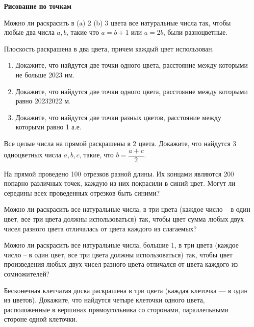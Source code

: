 \documentclass{article}
\begin{document}
    \large

    \begin{center}
        \textbf{Рисование по точкам}
    \end{center}


    \begin{enumerate_boxed}

        \item Можно ли раскрасить в (a) 2 (b) 3 цвета все натуральные числа так, чтобы любые два числа $a, b$, такие что $a = b + 1$ или $a = 2b$, были разноцветные.

        \item Плоскость раскрашена в два цвета, причем каждый цвет использован.
        \begin{enumerate}
            \item Докажите, что найдутся две точки одного цвета, расстояние между которыми не больше 2023 нм.

            \item Докажите, что найдутся две точки одного цвета, расстояние между которыми равно 20232022 м.

            \item Докажите, что найдутся две точки разных цветов, расстояние между которыми равно 1 а.е.
        \end{enumerate}

        \item Все целые числа на прямой раскрашены в 2 цвета.
        Докажите, что найдутся 3 одноцветных числа $a, b, c$, такие, что $b = \dfrac{a + c}{2}$.

        \item На прямой проведено 100 отрезков разной длины.
        Их концами являются 200 попарно различных точек, каждую из них покрасили в синий цвет.
        Могут ли середины всех проведенных отрезков быть синими?

        \item Можно ли раскрасить все натуральные числа, в три цвета (каждое число – в один цвет, все три цвета должны использоваться) так, чтобы цвет сумма любых двух чисел разного цвета отличалась от цвета каждого из слагаемых?

        \item Можно ли раскрасить все натуральные числа, большие 1, в три цвета (каждое число – в один цвет, все три цвета должны использоваться) так, чтобы цвет произведения любых двух чисел разного цвета отличался от цвета каждого из сомножителей?

        \item Бесконечная клетчатая доска раскрашена в три цвета (каждая клеточка — в один из цветов).
        Докажите, что найдутся четыре клеточки одного цвета, расположенные в вершинах прямоугольника со сторонами, параллельными стороне одной клеточки.

    \end{enumerate_boxed}
\end{document}
